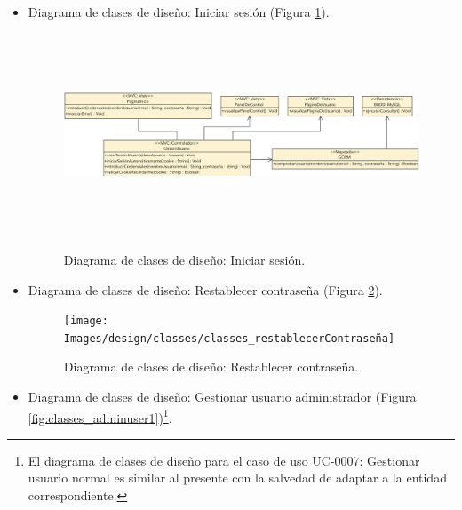 \documentclass[12pt,a4paper, twoside]{report}
\begin{document}
\begin{itemize}
		\newpage
		
		\item Diagrama de clases de diseño: Iniciar sesión (Figura \ref{fig:classes_iniciarSesion}).
		
		\begin{figure}[!ht]   
			\caption{Diagrama de clases de diseño: Iniciar sesión.} 
			\begin{center} 
	 			\includegraphics[width=17cm,height=6cm]{Images/design/classes/classes_iniciarSesion} \\
				\label{fig:classes_iniciarSesion} 
			\end{center}  
		\end{figure} 
		
		\item Diagrama de clases de diseño: Restablecer contraseña (Figura \ref{fig:classes_contraseña}).

		\begin{figure}[!ht]   
			\caption{Diagrama de clases de diseño: Restablecer contraseña.} 
			\begin{center} 
	 			\texttt{[image: Images/design/classes/classes\_restablecerContraseña]} \\
				\label{fig:classes_contraseña} 
			\end{center}  
		\end{figure} 
		
		\newpage
		
		\item Diagrama de clases de diseño: Gestionar usuario administrador (Figura \ref{fig:classes_adminuser1})\footnote{El diagrama de clases de diseño para el caso de uso UC-0007: Gestionar usuario normal es similar al presente con la salvedad de adaptar a la entidad correspondiente.}.
		 

\end{itemize}
\end{document}
